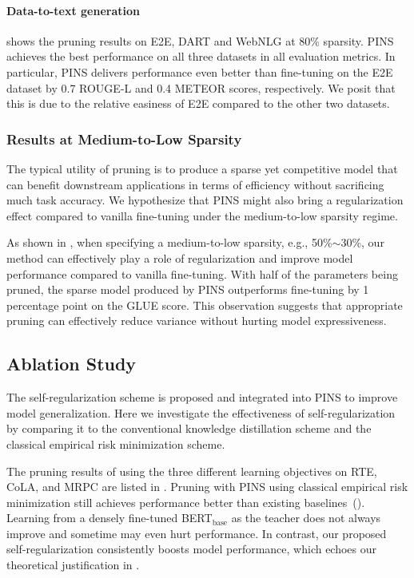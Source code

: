 \paragraph{Data-to-text generation} 
 shows the pruning results on E2E, DART and WebNLG at 80\% sparsity. PINS achieves the best performance on all three datasets in all evaluation metrics. In particular, PINS delivers performance even better than fine-tuning on the E2E dataset by 0.7 ROUGE-L and 0.4 METEOR scores, respectively. We posit that this is due to the relative easiness of E2E compared to the other two datasets.


\subsubsection{Results at Medium-to-Low Sparsity}
The typical utility of pruning is to produce a sparse yet competitive model that can benefit downstream applications in terms of efficiency without sacrificing much task accuracy. We hypothesize that PINS might also bring a regularization effect compared to vanilla fine-tuning under the medium-to-low sparsity regime. 

As shown in , when specifying a medium-to-low sparsity, e.g., 50\%$\sim$30\%, our method can effectively play a role of regularization and improve model performance compared to vanilla fine-tuning. With half of the parameters being pruned, the sparse model produced by PINS outperforms fine-tuning by 
1 percentage point on the GLUE score. This observation suggests that appropriate pruning can effectively reduce variance without hurting model expressiveness.

\subsection{Ablation Study}
The self-regularization scheme is proposed and integrated into PINS to improve model generalization. Here we investigate the effectiveness of self-regularization by comparing it to the conventional knowledge distillation scheme and the classical empirical risk minimization scheme.

The pruning results of using the three different learning objectives on RTE, CoLA, and MRPC are listed in . Pruning with PINS using classical empirical risk minimization still achieves performance better than existing baselines~(). Learning from a densely fine-tuned BERT$_{\text{base}}$ as the teacher does not always improve and sometime may even hurt performance. In contrast, our proposed self-regularization consistently boosts model performance, which echoes our theoretical justification in .


